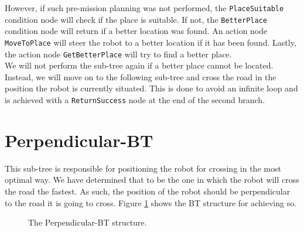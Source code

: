     However, if such pre-mission planning was not performed, the \texttt{PlaceSuitable} condition node will check if the place is suitable. If not, the \texttt{BetterPlace} condition node will return if a better location was found. An action node \texttt{MoveToPlace} will steer the robot to a better location if it has been found. Lastly, the action node \texttt{GetBetterPlace} will try to find a better place.\\
    We will not perform the sub-tree again if a better place cannot be located. Instead, we will move on to the following sub-tree and cross the road in the position the robot is currently situated. This is done to avoid an infinite loop and is achieved with a \texttt{ReturnSuccess} node at the end of the second branch.\\

\section{Perpendicular-BT}
\label{sec:Perpendicular-BT}
    This sub-tree is responsible for positioning the robot for crossing in the most optimal way. We have determined that to be the one in which the robot will cross the road the fastest. As such, the position of the robot should be perpendicular to the road it is going to cross. Figure \ref{fig:Perpendicular-BT} shows the BT structure for achieving so.
    \begin{figure}[ht]
        \caption{The Perpendicular-BT structure.}
        \label{fig:Perpendicular-BT}
    \end{figure}
